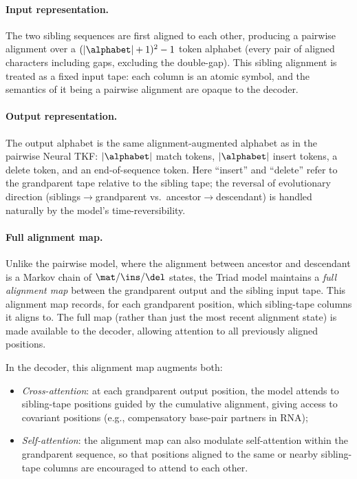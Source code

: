 \paragraph{Input representation.}
The two sibling sequences are first aligned to each other,
producing a pairwise alignment over a $(|\alphabet|+1)^2 - 1$ token alphabet
(every pair of aligned characters including gaps, excluding the double-gap).
This sibling alignment is treated as a fixed input tape:
each column is an atomic symbol,
and the semantics of it being a pairwise alignment are opaque to the decoder.

\paragraph{Output representation.}
The output alphabet is the same alignment-augmented alphabet
as in the pairwise Neural TKF:
$|\alphabet|$ match tokens, $|\alphabet|$ insert tokens,
a delete token, and an end-of-sequence token.
Here ``insert'' and ``delete'' refer to the grandparent tape
relative to the sibling tape;
the reversal of evolutionary direction
(siblings$\to$grandparent vs.\ ancestor$\to$descendant)
is handled naturally by the model's time-reversibility.

\paragraph{Full alignment map.}
Unlike the pairwise model, where the alignment between ancestor and descendant
is a Markov chain of $\mat/\ins/\del$ states,
the Triad model maintains a \emph{full alignment map}
between the grandparent output and the sibling input tape.
This alignment map records, for each grandparent position,
which sibling-tape columns it aligns to.
The full map (rather than just the most recent alignment state)
is made available to the decoder,
allowing attention to all previously aligned positions.

In the decoder, this alignment map augments both:
\begin{itemize}[nosep]
\item \emph{Cross-attention}: at each grandparent output position,
  the model attends to sibling-tape positions
  guided by the cumulative alignment,
  giving access to covariant positions
  (e.g., compensatory base-pair partners in RNA);
\item \emph{Self-attention}: the alignment map can also modulate
  self-attention within the grandparent sequence,
  so that positions aligned to the same or nearby sibling-tape columns
  are encouraged to attend to each other.
\end{itemize}

